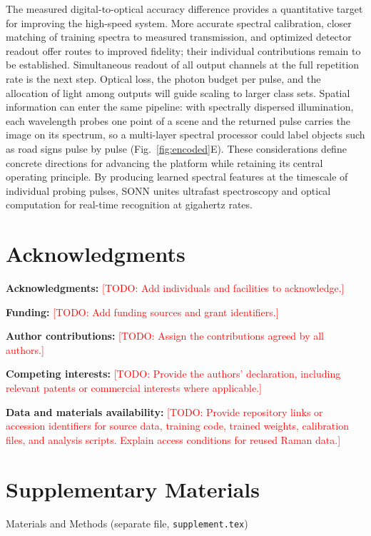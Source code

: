 \documentclass[11pt]{article}
\newcommand{\todo}[1]{\textcolor{red}{[TODO: #1]}}
\begin{document}
The measured digital-to-optical accuracy difference provides a quantitative target for improving the high-speed system. More accurate spectral calibration, closer matching of training spectra to measured transmission, and optimized detector readout offer routes to improved fidelity; their individual contributions remain to be established. Simultaneous readout of all output channels at the full repetition rate is the next step. Optical loss, the photon budget per pulse, and the allocation of light among outputs will guide scaling to larger class sets. Spatial information can enter the same pipeline: with spectrally dispersed illumination, each wavelength probes one point of a scene and the returned pulse carries the image on its spectrum, so a multi-layer spectral processor could label objects such as road signs pulse by pulse (Fig.~\ref{fig:encoded}E). These considerations define concrete directions for advancing the platform while retaining its central operating principle. By producing learned spectral features at the timescale of individual probing pulses, SONN unites ultrafast spectroscopy and optical computation for real-time recognition at gigahertz rates.

\section*{Acknowledgments}
\textbf{Acknowledgments:} \todo{Add individuals and facilities to acknowledge.}

\textbf{Funding:} \todo{Add funding sources and grant identifiers.}

\textbf{Author contributions:} \todo{Assign the contributions agreed by all authors.}

\textbf{Competing interests:} \todo{Provide the authors' declaration, including relevant patents or commercial interests where applicable.}

\textbf{Data and materials availability:} \todo{Provide repository links or accession identifiers for source data, training code, trained weights, calibration files, and analysis scripts. Explain access conditions for reused Raman data.}




\section*{Supplementary Materials}
Materials and Methods (separate file, \texttt{supplement.tex})
\end{document}
